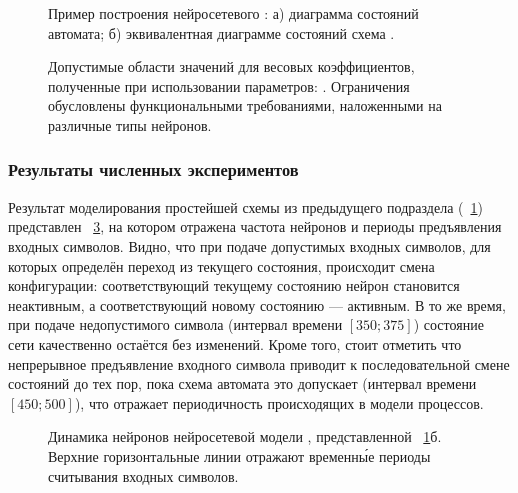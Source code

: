 \begin{figure}[ht]
    \caption{Пример построения нейросетевого : а) диаграмма состояний автомата; б) эквивалентная диаграмме состояний схема .} 
    \label{img:fsm_example_topology}  
\end{figure}

\begin{figure}[ht]
    \caption{Допустимые области значений для весовых коэффициентов, полученные при использовании параметров: . Ограничения обусловлены функциональными требованиями, наложенными на различные типы нейронов. } 
    \label{img:fsm_example_weights}  
\end{figure}


\subsubsection{Результаты численных экспериментов}

Результат моделирования простейшей схемы  из предыдущего подраздела (\seefigure~\ref{img:fsm_example_topology}) представлен \onfigure~\ref{img:fsm_example_dynamic}, на котором отражена частота нейронов  и периоды предъявления входных символов. Видно, что при подаче допустимых входных символов, \ie для которых определён переход из текущего состояния, происходит смена конфигурации: соответствующий текущему состоянию нейрон становится неактивным, а соответствующий новому состоянию --- активным. В то же время, при подаче недопустимого символа (интервал времени $[350; 375]$) состояние сети качественно остаётся без изменений. Кроме того, стоит отметить что непрерывное предъявление входного символа приводит к последовательной смене состояний до тех пор, пока схема автомата это допускает (интервал времени $[450; 500]$), что отражает периодичность происходящих в модели процессов.

\begin{figure}[ht]
    \caption{Динамика нейронов  нейросетевой модели , представленной \onfigure~\ref{img:fsm_example_topology}б. Верхние горизонтальные линии отражают временн\'{ы}е периоды считывания входных символов.} 
    \label{img:fsm_example_dynamic}  
\end{figure}

